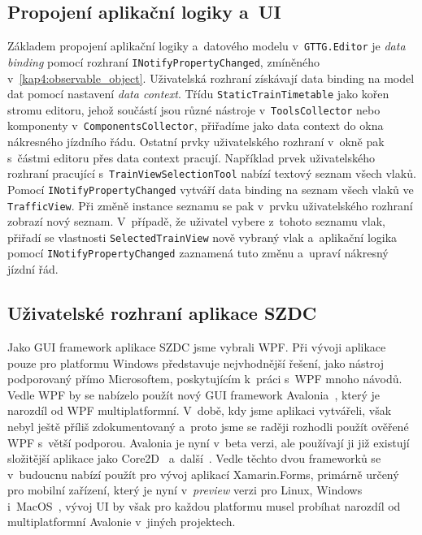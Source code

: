 \subsection*{Propojení aplikační logiky a~UI}
Základem propojení aplikační logiky a~datového modelu v~\texttt{GTTG.Editor} je \textit{data binding} pomocí rozhraní \texttt{INotifyPropertyChanged}, zmíněného v~\ref{kap4:observable_object}. Uživatelská rozhraní získávají data binding na model dat pomocí nastavení \textit{data context}. Třídu \texttt{StaticTrainTimetable} jako kořen stromu editoru, jehož součástí jsou různé nástroje v~\texttt{ToolsCollector} nebo komponenty v~\texttt{ComponentsCollector}, přiřadíme jako data context do okna nákresného jízdního řádu. Ostatní prvky uživatelského rozhraní v~okně pak s~částmi editoru přes data context pracují. Například prvek uživatelského rozhraní pracující s~\texttt{TrainViewSelectionTool} nabízí textový seznam všech vlaků. Pomocí \texttt{INotifyPropertyChanged} vytváří data binding na seznam všech vlaků ve \texttt{TrafficView}. Při změně instance seznamu se pak v~prvku uživatelského rozhraní zobrazí nový seznam. V~případě, že uživatel vybere z~tohoto seznamu vlak, přiřadí se vlastnosti \texttt{SelectedTrainView} nově vybraný vlak a~aplikační logika pomocí \texttt{INotifyPropertyChanged} zaznamená tuto změnu a~upraví nákresný jízdní řád.

\subsection*{Uživatelské rozhraní aplikace SZDC}
Jako GUI framework aplikace SZDC jsme vybrali WPF. Při vývoji aplikace pouze pro platformu Windows představuje nejvhodnější řešení, jako nástroj podporovaný přímo Microsoftem, poskytujícím k~práci s~WPF mnoho návodů. Vedle WPF by se nabízelo použít nový GUI framework Avalonia~\cite{Avalonia}, který je narozdíl od WPF multiplatformní. V~době, kdy jsme aplikaci vytvářeli, však nebyl ještě příliš zdokumentovaný a~proto jsme se raději rozhodli použít ověřené WPF s~větší podporou. Avalonia je nyní v~beta verzi, ale používají ji již existují složitější aplikace jako Core2D~\cite{Core2D} a~další~\cite{Avalonia_apps}. Vedle těchto dvou frameworků se v~budoucnu nabízí použít pro vývoj aplikací Xamarin.Forms, primárně určený pro mobilní zařízení, který je nyní v~\textit{preview} verzi pro Linux, Windows i~MacOS~\cite{XamarinForms_other_platforms}, vývoj UI by však pro každou platformu musel probíhat narozdíl od multiplatformní Avalonie v~jiných projektech.

